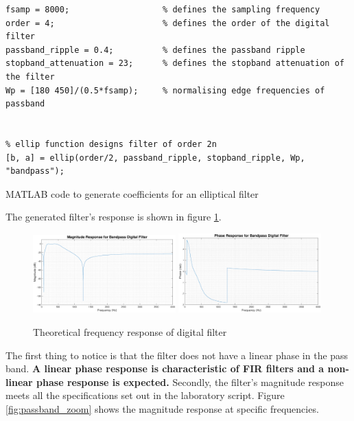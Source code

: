 \documentclass{article}
\begin{document}
\begin{listing}[H]
\begin{verbatim}
fsamp = 8000;                   % defines the sampling frequency
order = 4;                      % defines the order of the digital filter
passband_ripple = 0.4;          % defines the passband ripple
stopband_attenuation = 23;      % defines the stopband attenuation of the filter
Wp = [180 450]/(0.5*fsamp);     % normalising edge frequencies of passband


% ellip function designs filter of order 2n
[b, a] = ellip(order/2, passband_ripple, stopband_ripple, Wp, "bandpass");
\end{verbatim}
\caption{MATLAB code to generate coefficients for an elliptical filter} 
\label{lst:MATLAB_elliptical}
\end{listing}

The generated filter's response is shown in figure \ref{fig:elliptical_theoretical_response}. 

\begin{figure}[H]
    \centering
    \includegraphics[width = 0.49\textwidth]{mag_response_digital_filter}
    \includegraphics[width = 0.49\textwidth]{phase_response_digital_filter}
    \caption{Theoretical frequency response of digital filter}
    \label{fig:elliptical_theoretical_response}
\end{figure}

The first thing to notice is that the filter does not have a linear phase in the pass band. \textbf{A linear phase response is characteristic of FIR filters and a non-linear phase response is expected.} Secondly, the filter's magnitude response meets all the specifications set out in the laboratory script. Figure \ref{fig:passband_zoom} shows the magnitude response at specific frequencies.
\end{document}
